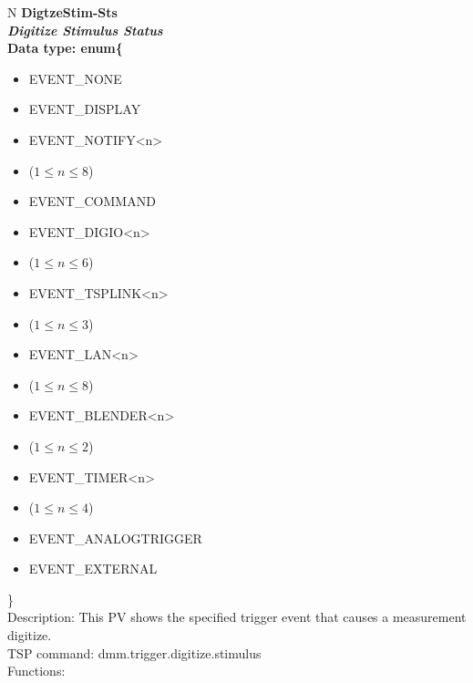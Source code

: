 \documentclass[openany]{article}
\begin{document}
		\begin{tabular}{N}
			\hline
			\bfseries DigtzeStim-Sts\label{pv:digtzestim-sts} \\ \hline
			\emph{Digitize Stimulus Status} \\
			Data type: enum\{\begin{itemize}[noitemsep]
				\small
				\item[] EVENT\_NONE
				\item[] EVENT\_DISPLAY
				\item[] EVENT\_NOTIFY\textless n\textgreater
				\item[] ($1\leq n\leq 8$)
				\item[] EVENT\_COMMAND
				\item[] EVENT\_DIGIO\textless n\textgreater
				\item[] ($1\leq n\leq 6$)
				\item[] EVENT\_TSPLINK\textless n\textgreater
				\item[] ($1\leq n\leq 3$)
				\item[] EVENT\_LAN\textless n\textgreater
				\item[] ($1\leq n\leq 8$)
				\item[] EVENT\_BLENDER\textless n\textgreater 
				\item[] ($1\leq n\leq 2$)
				\item[] EVENT\_TIMER\textless n\textgreater
				\item[] ($1\leq n\leq 4$)
				\item[] EVENT\_ANALOGTRIGGER
				\item[] EVENT\_EXTERNAL
			\end{itemize}\} \\
			Description: This PV shows the specified trigger event that causes a measurement digitize. \\
			TSP command: dmm.trigger.digitize.stimulus \\
			Functions: \\
			\arrayrulecolor{\FuncTableBorderColor}

		\end{tabular}
\end{document}
